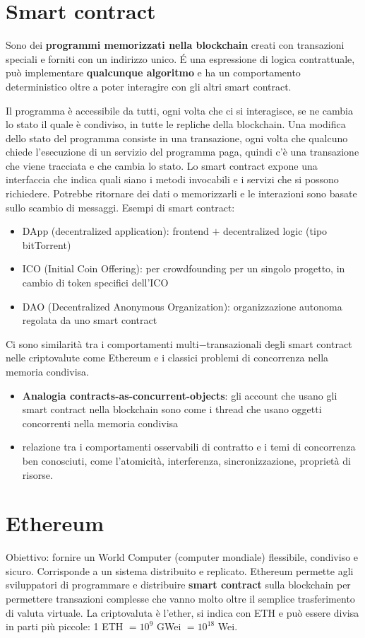 \section{Smart contract}
Sono dei \textbf{programmi memorizzati nella blockchain} creati con transazioni speciali e forniti con un indirizzo unico. \'E una espressione di logica contrattuale, può implementare \textbf{qualcunque algoritmo} e ha un comportamento deterministico oltre a poter interagire con gli altri smart contract. 

Il programma è accessibile da tutti, ogni volta che ci si interagisce, se ne cambia lo stato il quale è condiviso, in tutte le repliche della blockchain. Una modifica dello stato del programma consiste in una transazione, ogni volta che qualcuno chiede l'esecuzione di un servizio del programma paga, quindi c'è una transazione che viene tracciata e che cambia lo stato.
Lo smart contract expone una interfaccia che indica quali siano i metodi invocabili e i servizi che si possono richiedere. Potrebbe ritornare dei dati o memorizzarli e le interazioni sono basate sullo scambio di messaggi. Esempi di smart contract:
\begin{itemize}
    \item DApp (decentralized application): frontend $+$ decentralized logic (tipo bitTorrent)
    \item ICO (Initial Coin Offering): per crowdfounding per un singolo progetto, in cambio di token specifici dell'ICO
    \item DAO (Decentralized Anonymous Organization): organizzazione autonoma regolata da uno smart contract 
\end{itemize}

Ci sono similarità tra i comportamenti multi$-$transazionali degli smart contract nelle criptovalute come Ethereum e i classici problemi di concorrenza nella memoria condivisa. 
\begin{itemize}
    \item \textbf{Analogia contracts-as-concurrent-objects}: gli account che usano gli smart contract nella blockchain sono come i thread che usano oggetti concorrenti nella memoria condivisa
    \item relazione tra i comportamenti osservabili di contratto e i temi di concorrenza ben conosciuti, come l'atomicità, interferenza, sincronizzazione, proprietà di risorse.
\end{itemize}


\section{Ethereum}
Obiettivo: fornire un World Computer (computer mondiale) flessibile, condiviso e sicuro. Corrisponde a un sistema distribuito e replicato. Ethereum permette agli sviluppatori di programmare e distribuire \textbf{smart contract} sulla blockchain per permettere transazioni complesse che vanno molto oltre il semplice trasferimento di valuta virtuale. La criptovaluta è l'ether, si indica con ETH e può essere divisa in parti più piccole: 1 ETH $= 10^9$ GWei $= 10^{18}$ Wei.  \\

